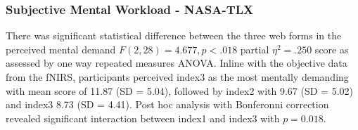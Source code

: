 \documentclass[../main/Feedback.tex]{subfiles}
\begin{document}
		
		\subsubsection{Subjective Mental Workload - NASA-TLX}
		There was significant statistical difference between the three web forms in the perceived mental demand $F(2,28)=4.677, p<.018$ partial $\eta^{2}=.250$ score as assessed by one way repeated measures ANOVA. Inline with the objective data from the fNIRS, participants perceived index3 as the most mentally demanding with mean score of 11.87 (SD = 5.04), followed by index2 with 9.67 (SD = 5.02) and index3 8.73 (SD = 4.41). Post hoc analysis with Bonferonni correction revealed significant interaction between index1 and index3 with $p=0.018$.
		
\end{document}
